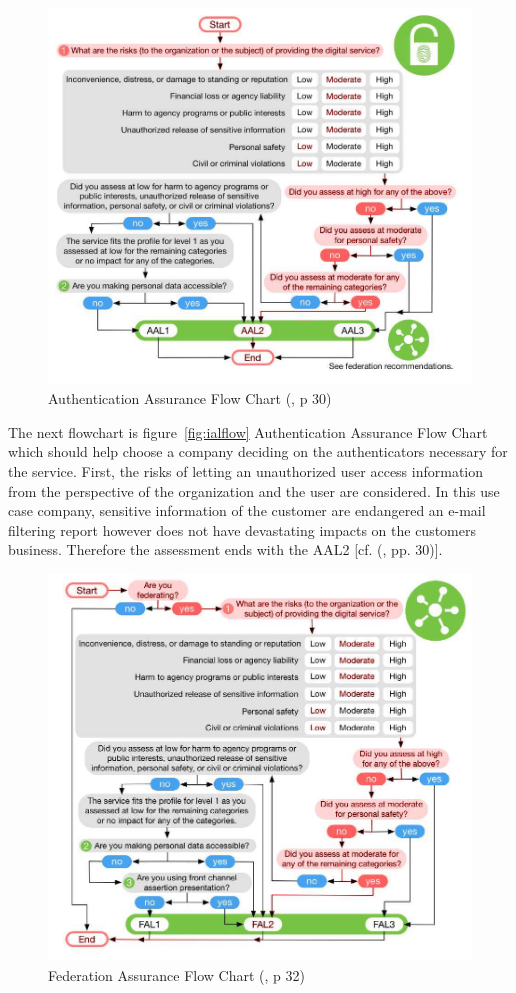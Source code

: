 \begin{figure}[h]
	\centering
	\includegraphics[width=0.9\linewidth]{images/aal_flow}
	\caption{Authentication Assurance Flow Chart (\cite{NIST:2017:DIG}, p 30)}
	\label{fig:aalflow}
\end{figure}

The next flowchart is figure~\ref{fig:ialflow} Authentication Assurance Flow Chart which should help choose a company deciding on the authenticators necessary for the service. First, the risks of letting an unauthorized user access information from the perspective of the organization and the user are considered. In this use case company, sensitive information of the customer are endangered an e-mail filtering report however does not have devastating impacts on the customers business. Therefore the assessment ends with the AAL2 [cf. (\cite{NIST:2017:DIG}, pp. 30)].  

\begin{figure}[h]
	\centering
	\includegraphics[width=0.9\linewidth]{images/fal_flow}
	\caption{Federation Assurance Flow Chart (\cite{NIST:2017:DIG}, p 32)}
	\label{fig:falflow}
\end{figure}

